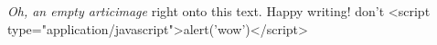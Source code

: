 \textit{Oh, an empty articimage} right onto this text. Happy writing! 
don't <script type="application/javascript">alert('wow')</script>